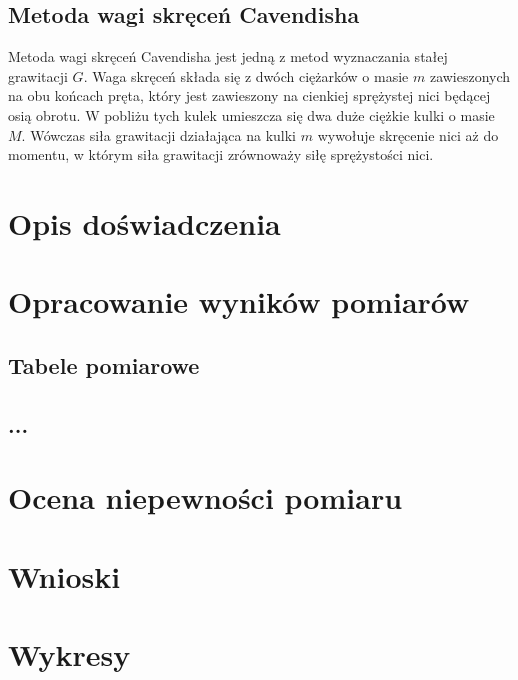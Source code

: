 \documentclass[a4paper,12pt]{article}
\begin{document}
\subsection*{Metoda wagi skręceń Cavendisha}

Metoda wagi skręceń Cavendisha jest jedną z metod wyznaczania stałej grawitacji $G$. Waga skręceń składa się z dwóch ciężarków o masie $m$ zawieszonych na obu końcach pręta, który jest zawieszony na cienkiej sprężystej nici będącej osią obrotu. W pobliżu tych kulek umieszcza się dwa duże ciężkie kulki o masie $M$. Wówczas siła grawitacji działająca na kulki $m$ wywołuje skręcenie nici aż do momentu, w którym siła grawitacji zrównoważy siłę sprężystości nici.


\section{Opis doświadczenia}

\section{Opracowanie wyników pomiarów}

\subsection{Tabele pomiarowe}

\subsection{...}

\section{Ocena niepewności pomiaru}

\section{Wnioski}

\section{Wykresy}



\end{document}

